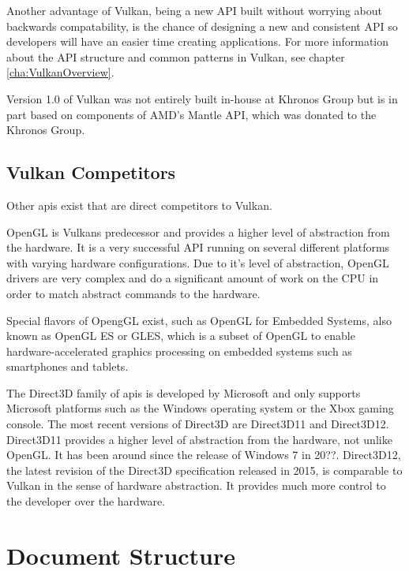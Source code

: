     Another advantage of Vulkan, being a new API built without worrying about backwards compatability, is the chance of designing a new and consistent API so developers will have an easier time creating applications. For more information about the API structure and common patterns in Vulkan, see chapter \ref{cha:VulkanOverview}.

    Version 1.0 of Vulkan was not entirely built in-house at Khronos Group but is in part based on components of AMD's Mantle API, which was donated to the Khronos Group.


    \subsection{Vulkan Competitors}

      Other \glspl{api} exist that are direct competitors to Vulkan.

      OpenGL is Vulkans predecessor and provides a higher level of abstraction from the hardware. It is a very successful API running on several different platforms with varying hardware configurations. Due to it's level of abstraction, OpenGL drivers are very complex and do a significant amount of work on the CPU in order to match abstract commands to the hardware.

      Special flavors of OpengGL exist, such as OpenGL for Embedded Systems, also known as OpenGL ES or GLES, which is a subset of OpenGL to enable hardware-accelerated graphics processing on embedded systems such as smartphones and tablets.

      The Direct3D family of \glspl{api} is developed by Microsoft and only supports Microsoft platforms such as the Windows operating system or the Xbox gaming console. The most recent versions of Direct3D are Direct3D11 and Direct3D12. Direct3D11 provides a higher level of abstraction from the hardware, not unlike OpenGL. It has been around since the release of Windows 7 in 20??. Direct3D12, the latest revision of the Direct3D specification released in 2015, is comparable to Vulkan in the sense of hardware abstraction. It provides much more control to the developer over the hardware.





  \section{Document Structure}

    \tbd
